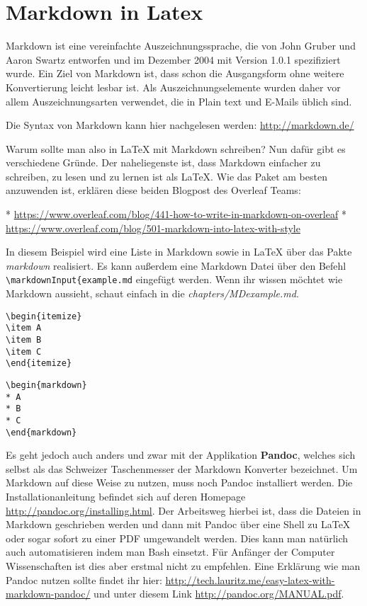 \chapter{Markdown in Latex}
\label{MarkdowninLatex}
Markdown ist eine vereinfachte Auszeichnungssprache, die von John Gruber und Aaron Swartz entworfen und im Dezember 2004 mit Version 1.0.1 spezifiziert wurde. Ein Ziel von Markdown ist, dass schon die Ausgangsform ohne weitere Konvertierung leicht lesbar ist. Als Auszeichnungselemente wurden daher vor allem Auszeichnungsarten verwendet, die in Plain text und E-Mails üblich sind. \cite{WikiMarkdown,rfc7763}

Die Syntax von Markdown kann hier nachgelesen werden: \url{http://markdown.de/}

Warum sollte man also in \LaTeX{} mit Markdown schreiben? Nun dafür gibt es verschiedene Gründe. Der naheliegenste ist, dass Markdown einfacher zu schreiben, zu lesen und zu lernen ist als \LaTeX.  Wie das Paket am besten anzuwenden ist, erklären diese beiden Blogpost des Overleaf Teams:

\begin{markdown}
 * \url{https://www.overleaf.com/blog/441-how-to-write-in-markdown-on-overleaf}
 * \url{https://www.overleaf.com/blog/501-markdown-into-latex-with-style} 
\end{markdown}

In diesem Beispiel wird eine Liste in Markdown sowie in \LaTeX{} über das Pakte \emph{markdown} realisiert. Es kann außerdem eine Markdown Datei über den Befehl \verb|\markdownInput{example.md| eingefügt werden. Wenn ihr wissen möchtet wie Markdown aussieht, schaut einfach in die \emph{chapters/MDexample.md}.
\begin{lstlisting}[style=LaTeX]
\begin{itemize}
\item A
\item B
\item C
\end{itemize}
\end{lstlisting}

\begin{lstlisting}[style=LaTeX]
\begin{markdown}
* A
* B
* C
\end{markdown}
\end{lstlisting}


Es geht jedoch auch anders und zwar mit der Applikation \textbf{Pandoc}, welches sich selbst als das Schweizer Taschenmesser der Markdown Konverter bezeichnet. Um Markdown auf diese Weise zu nutzen, muss noch Pandoc installiert werden. Die Installationanleitung befindet sich auf deren Homepage \url{http://pandoc.org/installing.html}. Der Arbeitsweg hierbei ist, dass die Dateien in Markdown geschrieben werden und dann mit Pandoc über eine Shell zu \LaTeX{} oder sogar sofort zu einer PDF umgewandelt werden. Dies kann man natürlich auch automatisieren indem man Bash einsetzt. Für Anfänger der Computer Wissenschaften ist dies aber erstmal nicht zu empfehlen. Eine Erklärung wie man Pandoc nutzen sollte findet ihr hier: \url{http://tech.lauritz.me/easy-latex-with-markdown-pandoc/} und unter diesem Link \url{http://pandoc.org/MANUAL.pdf}.  


